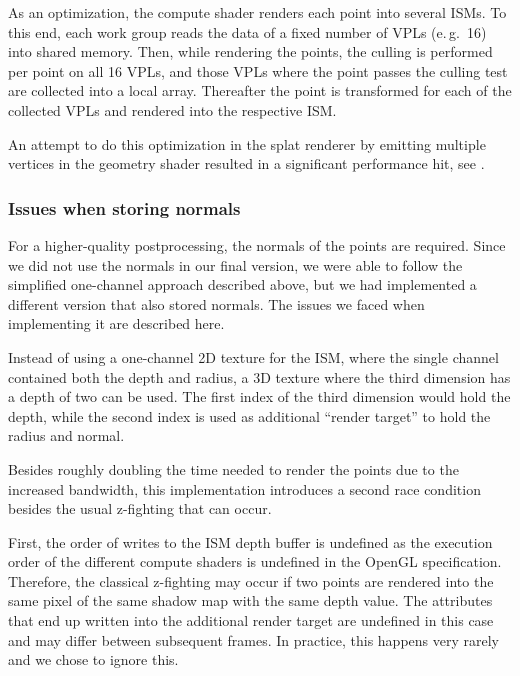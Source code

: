As an optimization, the compute shader renders each point into several ISMs. To this end, each work group reads the data of a fixed number of VPLs (e.\,g.\ 16) into shared memory. Then, while rendering the points, the culling is performed per point on all 16 VPLs, and those VPLs where the point passes the culling test are collected into a local array. Thereafter the point is transformed for each of the collected VPLs and rendered into the respective ISM.


An attempt to do this optimization in the splat renderer by emitting multiple vertices in the geometry shader resulted in a significant performance hit, see .


\subsubsection{Issues when storing normals}
\label{sec:impl:raceCondition}

For a higher-quality postprocessing, the normals of the points are required. Since we did not use the normals in our final version, we were able to follow the simplified one-channel approach described above, but we had implemented a different version that also stored normals. The issues we faced when implementing it are described here.

Instead of using a one-channel 2D texture for the ISM, where the single channel contained both the depth and radius, a 3D texture where the third dimension has a depth of two can be used. The first index of the third dimension would hold the depth, while the second index is used as additional ``render target'' to hold the radius and normal.

Besides roughly doubling the time needed to render the points due to the increased bandwidth, this implementation introduces a second race condition besides the usual z-fighting that can occur.

First, the order of writes to the ISM depth buffer is undefined as the execution order of the different compute shaders is undefined in the OpenGL specification. Therefore, the classical z-fighting may occur if two points are rendered into the same pixel of the same shadow map with the same depth value. The attributes that end up written into the additional render target are undefined in this case and may differ between subsequent frames. In practice, this happens very rarely and we chose to ignore this.

